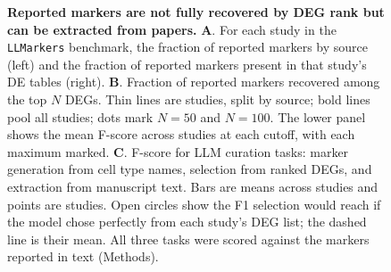 \begin{figure}[ht!]
  \centering
  
  \caption{\textbf{Reported markers are not fully recovered by DEG rank but can be extracted from papers.} \textbf{A}. For each study in the \texttt{LLMarkers} benchmark, the fraction of reported markers by source (left) and the fraction of reported markers present in that study's DE tables (right). \textbf{B}. Fraction of reported markers recovered among the top $N$ DEGs. Thin lines are studies, split by source; bold lines pool all studies; dots mark $N=50$ and $N=100$. The lower panel shows the mean F-score across studies at each cutoff, with each maximum marked. \textbf{C}. F-score for LLM curation tasks: marker generation from cell type names, selection from ranked DEGs, and extraction from manuscript text. Bars are means across studies and points are studies. Open circles show the F1 selection would reach if the model chose perfectly from each study's DEG list; the dashed line is their mean. All three tasks were scored against the markers reported in text (Methods).}
  \label{fig:marker_selection}%
  \label{fig:llm_curation}%
\end{figure}
